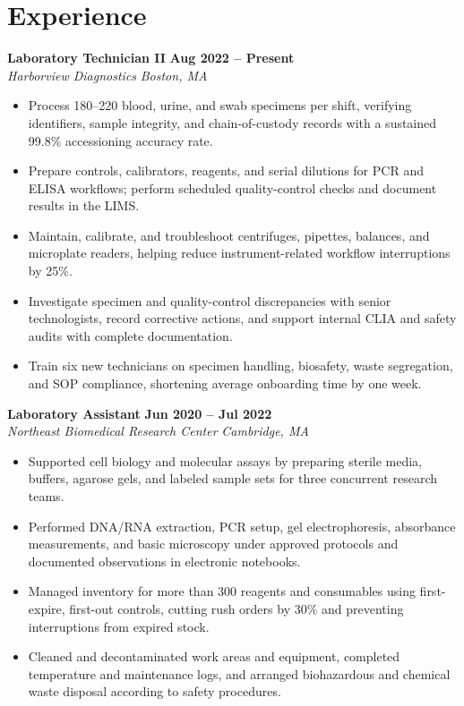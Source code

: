 \documentclass[10pt,letterpaper]{article}
\newcommand{\job}[4]{%
  \textbf{#1} \hfill \textbf{#2}\\[-1pt]
  \textit{#3} \hfill \textit{#4}\par
}
\begin{document}
\section*{Experience}
\job{Laboratory Technician II}{Aug 2022 -- Present}{Harborview Diagnostics}{Boston, MA}
\begin{itemize}
  \item Process 180--220 blood, urine, and swab specimens per shift, verifying identifiers, sample integrity, and chain-of-custody records with a sustained 99.8\% accessioning accuracy rate.
  \item Prepare controls, calibrators, reagents, and serial dilutions for PCR and ELISA workflows; perform scheduled quality-control checks and document results in the LIMS.
  \item Maintain, calibrate, and troubleshoot centrifuges, pipettes, balances, and microplate readers, helping reduce instrument-related workflow interruptions by 25\%.
  \item Investigate specimen and quality-control discrepancies with senior technologists, record corrective actions, and support internal CLIA and safety audits with complete documentation.
  \item Train six new technicians on specimen handling, biosafety, waste segregation, and SOP compliance, shortening average onboarding time by one week.
\end{itemize}

\job{Laboratory Assistant}{Jun 2020 -- Jul 2022}{Northeast Biomedical Research Center}{Cambridge, MA}
\begin{itemize}
  \item Supported cell biology and molecular assays by preparing sterile media, buffers, agarose gels, and labeled sample sets for three concurrent research teams.
  \item Performed DNA/RNA extraction, PCR setup, gel electrophoresis, absorbance measurements, and basic microscopy under approved protocols and documented observations in electronic notebooks.
  \item Managed inventory for more than 300 reagents and consumables using first-expire, first-out controls, cutting rush orders by 30\% and preventing interruptions from expired stock.
  \item Cleaned and decontaminated work areas and equipment, completed temperature and maintenance logs, and arranged biohazardous and chemical waste disposal according to safety procedures.
\end{itemize}
\end{document}
